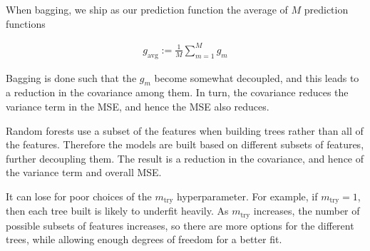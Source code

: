 \documentclass[12pt]{article}
\begin{document}
\begin{enumerate}

When bagging, we ship as our prediction function the average of $M$ prediction
functions

\begin{align*}
	g_{\text{avg}} := \frac{1}{M} \sum_{m=1}^{M} g_m
\end{align*}

Bagging is done such that the $g_m$ become somewhat decoupled, and this
leads to a reduction in the covariance among them. In turn, the covariance
reduces the variance term in the MSE, and hence the MSE also reduces.


Random forests use a subset of the features when building trees rather than all
of the features. Therefore the models are built based on different subsets of
features, further decoupling them. The result is a reduction in the covariance,
and hence of the variance term and overall MSE.


It can lose for poor choices of the $m_{\text{try}}$ hyperparameter.
For example, if $m_{\text{try}} = 1$, then each tree built is likely to
underfit heavily. As $m_{\text{try}}$ increases, the number of possible
subsets of features increases, so there are more options for the different
trees, while allowing enough degrees of freedom for a better fit.

\end{enumerate}



%
%
%
%
%
%
%
%
%
\end{document}

